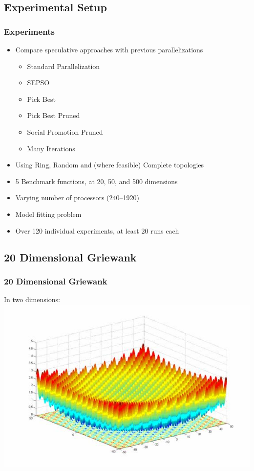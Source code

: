 \documentclass{beamer}
\begin{document}
\subsection{Experimental Setup}
\begin{frame}
  \frametitle{Experiments}
  \begin{itemize}
	\item Compare speculative approaches with previous parallelizations
	  \begin{itemize}
		\item Standard Parallelization
		\item SEPSO
		\item Pick Best
		\item Pick Best Pruned
		\item Social Promotion Pruned
		\item Many Iterations
	  \end{itemize}
	\item Using Ring, Random and (where feasible) Complete topologies
	\item 5 Benchmark functions, at 20, 50, and 500 dimensions
	\item Varying number of processors (240--1920)
	\item Model fitting problem
	\item Over 120 individual experiments, at least 20 runs each
  \end{itemize}
\end{frame}

\subsection{20 Dimensional Griewank}
\begin{frame}
  \frametitle{20 Dimensional Griewank}
  \begin{center}
	In two dimensions:
	\includegraphics[width=.8\textwidth]{griewank_image}
  \end{center}
\end{frame}
\end{document}
